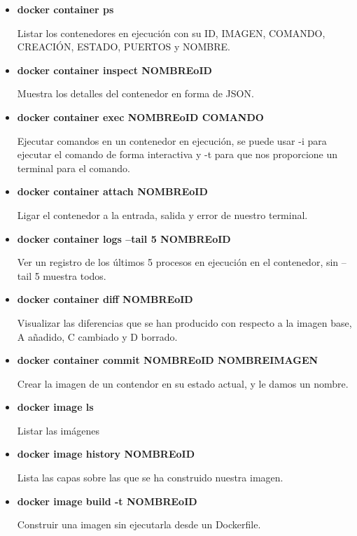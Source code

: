 \documentclass[12pt, twoside, openright]{report} %
\begin{document}
\begin{itemize}
	\item \textbf{docker container ps}

	      Listar los contenedores en ejecución con su ID, IMAGEN, COMANDO, CREACIÓN, ESTADO, PUERTOS y NOMBRE.

	\item \textbf{docker container inspect NOMBREoID}

	      Muestra los detalles del contenedor en forma de JSON.

	\item \textbf{docker container exec NOMBREoID COMANDO}

	      Ejecutar comandos en un contenedor en ejecución, se puede usar -i para ejecutar el comando de forma interactiva y -t para que nos proporcione un terminal para el comando.

	\item \textbf{docker container attach NOMBREoID}

	      Ligar el contenedor a la entrada, salida y error de nuestro terminal.

	\item \textbf{docker container logs --tail 5 NOMBREoID}

	      Ver un registro de los últimos 5 procesos en ejecución en el contenedor, sin --tail 5 muestra todos.

	\item \textbf{docker container diff NOMBREoID}

	      Visualizar las diferencias que se han producido con respecto a la imagen base, A añadido, C cambiado y D borrado.

	\item \textbf{docker container commit NOMBREoID NOMBREIMAGEN}

	      Crear la imagen de un contendor en su estado actual, y le damos un nombre.

	\item \textbf{docker image ls}

	      Listar las imágenes

	\item \textbf{docker image history NOMBREoID}

	      Lista las capas sobre las que se ha construido nuestra imagen.

	\item \textbf{docker image build -t NOMBREoID}

	      Construir una imagen sin ejecutarla desde un Dockerfile.


\end{itemize}
\end{document}
